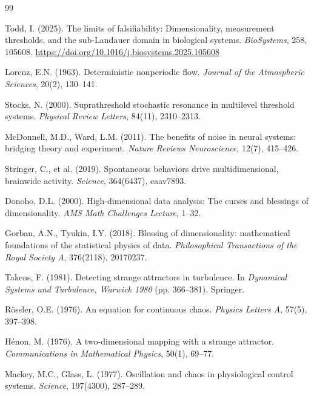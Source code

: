 \documentclass[12pt]{article}
\begin{document}
\begin{thebibliography}{99}

Todd, I. (2025). The limits of falsifiability: Dimensionality, measurement thresholds, and the sub-Landauer domain in biological systems. \textit{BioSystems}, 258, 105608. \url{https://doi.org/10.1016/j.biosystems.2025.105608}

Lorenz, E.N. (1963). Deterministic nonperiodic flow. \textit{Journal of the Atmospheric Sciences}, 20(2), 130--141.

Stocks, N. (2000). Suprathreshold stochastic resonance in multilevel threshold systems. \textit{Physical Review Letters}, 84(11), 2310--2313.

McDonnell, M.D., Ward, L.M. (2011). The benefits of noise in neural systems: bridging theory and experiment. \textit{Nature Reviews Neuroscience}, 12(7), 415--426.

Stringer, C., et al. (2019). Spontaneous behaviors drive multidimensional, brainwide activity. \textit{Science}, 364(6437), eaav7893.

Donoho, D.L. (2000). High-dimensional data analysis: The curses and blessings of dimensionality. \textit{AMS Math Challenges Lecture}, 1--32.

Gorban, A.N., Tyukin, I.Y. (2018). Blessing of dimensionality: mathematical foundations of the statistical physics of data. \textit{Philosophical Transactions of the Royal Society A}, 376(2118), 20170237.

Takens, F. (1981). Detecting strange attractors in turbulence. In \textit{Dynamical Systems and Turbulence, Warwick 1980} (pp. 366--381). Springer.

Rössler, O.E. (1976). An equation for continuous chaos. \textit{Physics Letters A}, 57(5), 397--398.

Hénon, M. (1976). A two-dimensional mapping with a strange attractor. \textit{Communications in Mathematical Physics}, 50(1), 69--77.

Mackey, M.C., Glass, L. (1977). Oscillation and chaos in physiological control systems. \textit{Science}, 197(4300), 287--289.

\end{thebibliography}
\end{document}
